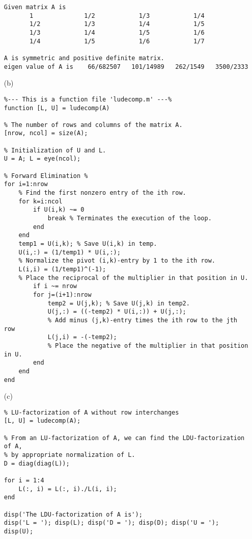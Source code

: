 \begin{exer}
\begin{sol}
\begin{enumerate}
\begin{outputs}
\begin{verbatim}
Given matrix A is
       1              1/2            1/3            1/4
       1/2            1/3            1/4            1/5
       1/3            1/4            1/5            1/6
       1/4            1/5            1/6            1/7

A is symmetric and positive definite matrix.
eigen value of A is    66/682507   101/14989   262/1549   3500/2333
\end{verbatim}
\end{outputs}



\item[(b)]
\begin{verbatim}
%--- This is a function file 'ludecomp.m' ---%
function [L, U] = ludecomp(A)

% The number of rows and columns of the matrix A.
[nrow, ncol] = size(A); 

% Initialization of U and L.
U = A; L = eye(ncol); 

% Forward Elimination %
for i=1:nrow
    % Find the first nonzero entry of the ith row.
    for k=i:ncol
        if U(i,k) ~= 0
            break % Terminates the execution of the loop.
        end
    end
    temp1 = U(i,k); % Save U(i,k) in temp.
    U(i,:) = (1/temp1) * U(i,:);
    % Normalize the pivot (i,k)-entry by 1 to the ith row.
    L(i,i) = (1/temp1)^(-1);
    % Place the reciprocal of the multiplier in that position in U.
        if i ~= nrow
        for j=(i+1):nrow
            temp2 = U(j,k); % Save U(j,k) in temp2.
            U(j,:) = ((-temp2) * U(i,:)) + U(j,:);
            % Add minus (j,k)-entry times the ith row to the jth row
            L(j,i) = -(-temp2);
            % Place the negative of the multiplier in that position in U.
        end
    end
end
\end{verbatim}


\item[(c)]
\begin{verbatim}
% LU-factorization of A without row interchanges
[L, U] = ludecomp(A); 

% From an LU-factorization of A, we can find the LDU-factorization of A,
% by appropriate normalization of L.
D = diag(diag(L));

for i = 1:4
    L(:, i) = L(:, i)./L(i, i);
end

disp('The LDU-factorization of A is');
disp('L = '); disp(L); disp('D = '); disp(D); disp('U = '); disp(U);


\end{verbatim}
\end{enumerate}
\end{sol}
\end{exer}
